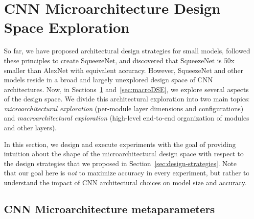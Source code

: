 \documentclass{article} %
\def\vsp{\vspace{-0.15in}}
\begin{document}
\section{CNN Microarchitecture Design Space Exploration}
\label{sec:microDSE}
\vsp

So far, we have proposed architectural design strategies for small models, followed these principles to create SqueezeNet, and discovered that SqueezeNet is 50x smaller than AlexNet with equivalent accuracy.
However, SqueezeNet and other models reside in a broad and largely unexplored design space of CNN architectures.
Now, in Sections~\ref{sec:microDSE} and~\ref{sec:macroDSE}, we explore several aspects of the design space. %
We divide this architectural exploration into two main topics: {\em microarchitectural exploration} (per-module layer dimensions and configurations) and {\em macroarchitectural exploration} (high-level end-to-end organization of modules and other layers). %

In this section, we design and execute experiments with the goal of providing intuition about the shape of the microarchitectural design space with respect to the design strategies that we proposed in Section~\ref{sec:design-strategies}.
Note that our goal here is {\em not} to maximize accuracy in every experiment, but rather to understand the impact of CNN architectural choices on model size and accuracy.

\subsection{CNN Microarchitecture metaparameters}
\label{sec:metaparameters}
\vsp
\end{document}
